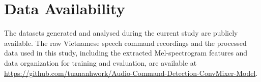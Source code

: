 \section*{Data Availability}

The datasets generated and analysed during the current study are publicly available. The raw Vietnamese speech command recordings and the processed data used in this study, including the extracted Mel-spectrogram features and data organization for training and evaluation, are available at \url{https://github.com/tuananhwork/Audio-Command-Detection-ConvMixer-Model}.
